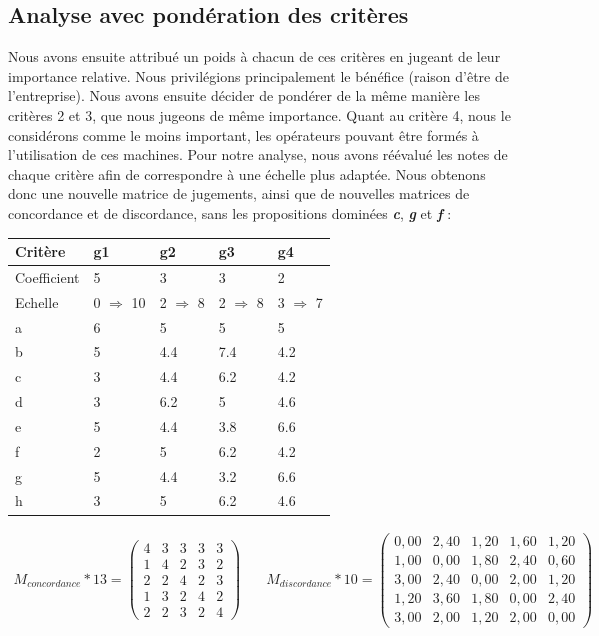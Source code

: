 \documentclass[12pt]{article}
\begin{document}
\subsection{Analyse avec pondération des critères} 
Nous avons ensuite attribué un poids à chacun de ces critères en jugeant de leur importance relative. Nous privilégions principalement le bénéfice (raison d'être de l'entreprise). Nous avons ensuite décider de pondérer de la même manière les critères 2 et 3, que nous jugeons de même importance. Quant au critère 4, nous le considérons comme le moins important, les opérateurs pouvant être formés à l'utilisation de ces machines.
Pour notre analyse, nous avons réévalué les notes de chaque critère afin de correspondre à une échelle plus adaptée. Nous obtenons donc une nouvelle matrice de jugements, ainsi que de nouvelles matrices de concordance et de discordance, sans les propositions dominées \textbf{\emph{c}}, \textbf{\emph{g}} et \textbf{\emph{f}} :
\begin{center}
\renewcommand{\arraystretch}{1.2}
\begin{tabular}{|L|M|M|M|M|}
\hline 
Critère & g1 & g2 & g3 & g4 \\\hline  
Coefficient & 5 & 3 & 3 & 2 \\ \hline 
Echelle & 0 $ \Rightarrow $ 10 & 2 $ \Rightarrow $ 8 & 2 $ \Rightarrow $ 8 & 3 $ \Rightarrow $ 7 \\ \hline 
a & 6 & 5 & 5 & 5 \\ \hline 
b & 5 & 4.4 & 7.4 & 4.2 \\ \hline 
c & 3 & 4.4 & 6.2 & 4.2 \\ \hline 
d & 3 & 6.2 & 5 & 4.6 \\ \hline 
e & 5 & 4.4 & 3.8 & 6.6 \\ \hline 
f & 2 & 5 & 6.2 & 4.2 \\ \hline 
g & 5 & 4.4 & 3.2 & 6.6 \\ \hline 
h & 3 & 5 & 6.2 & 4.6 \\ 
\hline 
\end{tabular} 
\end{center}
\begin{align*}
M_{concordance}*13 =
 \begin{pmatrix}
  4	&3	&3	&3	&3\\
1	&4	&2	&3	&2\\
2	&2	&4	&2	&3\\
1	&3	&2	&4	&2\\
2	&2	&3	&2	&4
 \end{pmatrix}& \quad
 M_{discordance}*10 =
 \begin{pmatrix}
 0,00	&2,40 &1,20 &1,60 &1,20\\
 1,00   &0,00 &1,80	&2,40 &0,60\\
 3,00	&2,40 &0,00 &2,00 &1,20\\
 1,20	&3,60	&1,80 &0,00	&2,40\\
 3,00	&2,00	&1,20  &2,00  &0,00
 \end{pmatrix}
\end{align*}
\end{document}
